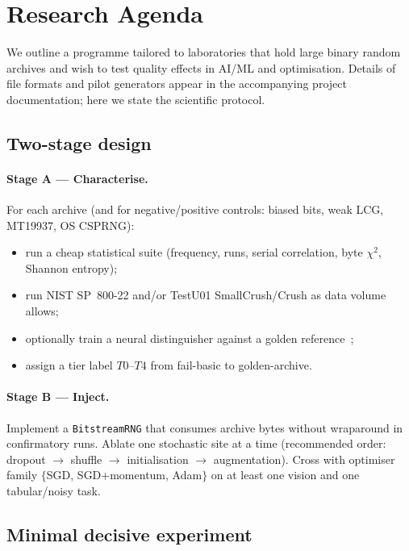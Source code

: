 \section{Research Agenda}
\label{sec:agenda}

We outline a programme tailored to laboratories that hold large binary random archives and wish to test quality effects in AI/ML and optimisation.
Details of file formats and pilot generators appear in the accompanying project documentation; here we state the scientific protocol.

\subsection{Two-stage design}

\paragraph{Stage A --- Characterise.}
For each archive (and for negative/positive controls: biased bits, weak LCG, MT19937, OS CSPRNG):
\begin{itemize}[leftmargin=*]
  \item run a cheap statistical suite (frequency, runs, serial correlation, byte $\chi^2$, Shannon entropy);
  \item run NIST SP~800-22 and/or TestU01 SmallCrush/Crush as data volume allows;
  \item optionally train a neural distinguisher against a golden reference~\cite{valle2024assessing};
  \item assign a tier label $T0$--$T4$ from fail-basic to golden-archive.
\end{itemize}

\paragraph{Stage B --- Inject.}
Implement a \texttt{BitstreamRNG} that consumes archive bytes without wraparound in confirmatory runs.
Ablate one stochastic site at a time (recommended order: dropout $\rightarrow$ shuffle $\rightarrow$ initialisation $\rightarrow$ augmentation).
Cross with optimiser family $\{$\textrm{SGD}, \textrm{SGD+momentum}, \textrm{Adam}$\}$ on at least one vision and one tabular/noisy task.

\subsection{Minimal decisive experiment}

